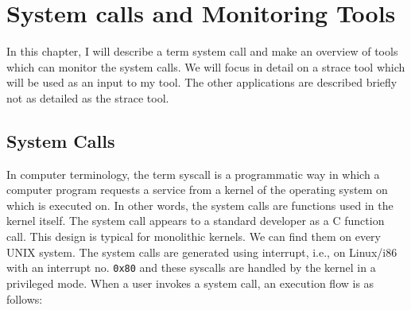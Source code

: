 \chapter{System calls and Monitoring Tools}
\label{chap:syscalls}
In this chapter, I will describe a term system call and make an overview of tools which can monitor the system calls.
We will focus in detail on a strace tool which will be used as an input to my tool.
The other applications are described briefly not as detailed as the strace tool.

\section{System Calls}

In computer terminology, the term syscall is a programmatic way in which a computer program requests a service from a kernel of the operating system on which is executed on.
In other words, the system calls are functions used in the kernel itself.
The system call appears to a standard developer as a C function call.
This design is typical for monolithic kernels.
We can find them on every UNIX system.
The system calls are generated using interrupt, i.e., on Linux/i86 with an interrupt no. \texttt{0x80} and these syscalls are handled by the kernel in a privileged mode.
When a user invokes a system call, an execution flow is as follows:

